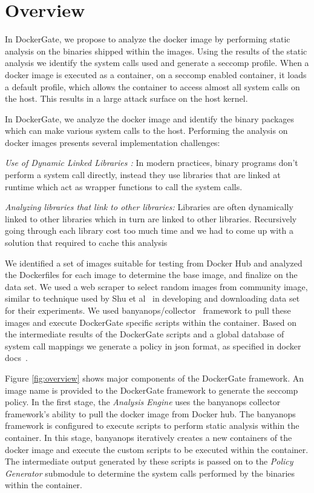 \section{Overview}
\label{sec:overview}

In DockerGate, we propose to analyze the docker image by performing static analysis on the binaries shipped within the images. Using the results of the static analysis we identify the system calls used and generate a seccomp profile. When a docker image is executed as a container, on a seccomp enabled container, it loads a default profile, which allows the container to access almost all system calls on the host. This results in a large attack surface on the host kernel. 

In DockerGate, we analyze the docker image and identify the binary packages which can make various system calls to the host. Performing the analysis on docker images presents several implementation challenges:

\textit{Use of Dynamic Linked Libraries :} In modern practices, binary programs don’t perform a system call directly, instead they use libraries that are linked at runtime which act as wrapper functions to call the system calls. 

\textit{Analyzing libraries that link to other libraries:} Libraries are often dynamically linked to other libraries which in turn are linked to other libraries. Recursively going through each library cost too much time and we had to come up with a solution that required to cache this analysis

We identified a set of images suitable for testing from Docker Hub and analyzed the Dockerfiles for each image to determine the base image, and finalize on the data set. We used a web scraper to select random images from community image, similar to technique used by Shu et al~\cite{shu} in developing and downloading data set for their experiments. We used banyanops/collector~\cite{banyanops} framework to pull these images and execute DockerGate specific scripts within the container. Based on the intermediate results of the DockerGate scripts and a global database of system call mappings we generate a policy in json format, as specified in docker docs~\cite{seccomp}.

Figure \ref{fig:overview} shows major components of the DockerGate framework. An image name is provided to the DockerGate framework to generate the seccomp policy. In the first stage, the \textit{Analysis Engine} uses the banyanops collector framework’s ability to pull the docker image from Docker hub. The banyanops framework is configured to execute scripts to perform static analysis within the container. In this stage, banyanops iteratively creates a new containers of the docker image and execute the custom scripts to be executed within the container.
The intermediate output generated by these scripts is passed on to the \textit{Policy Generator} submodule to determine the system calls performed by the binaries within the container. 

